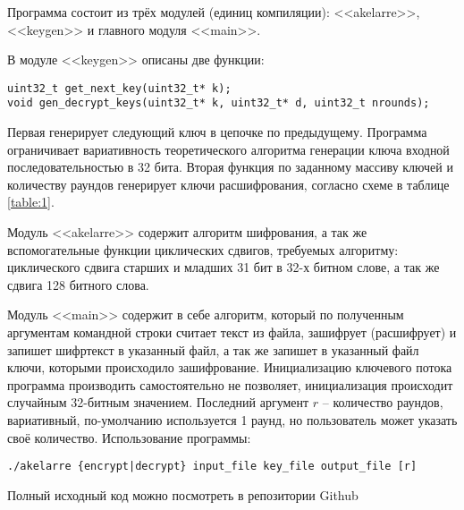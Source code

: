 \documentclass[12pt, a4paper]{article}
\begin{document}
Программа состоит из трёх модулей (единиц компиляции): <<akelarre>>, <<keygen>> и главного модуля <<main>>.

В модуле <<keygen>> описаны две функции: 

\begin{lstlisting}
uint32_t get_next_key(uint32_t* k);
void gen_decrypt_keys(uint32_t* k, uint32_t* d, uint32_t nrounds);
\end{lstlisting}

Первая генерирует следующий ключ в цепочке по предыдущему. Программа ограничивает вариативность теоретического алгоритма генерации ключа входной последовательностью в 32 бита. Вторая функция по заданному массиву ключей и количеству раундов генерирует ключи расшифрования, согласно схеме в таблице \ref{table:1}.

Модуль <<akelarre>> содержит алгоритм шифрования, а так же вспомогательные функции циклических сдвигов, требуемых алгоритму: циклического сдвига старших и младших 31 бит в 32-х битном слове, а так же сдвига 128 битного слова.

Модуль <<main>> содержит в себе алгоритм, который по полученным аргументам командной строки считает текст из файла, зашифрует (расшифрует) и запишет шифртекст в указанный файл, а так же запишет в указанный файл ключи, которыми происходило зашифрование. Инициализацию ключевого потока программа производить самостоятельно не позволяет, инициализация происходит случайным 32-битным значением. Последний аргумент $r$ -- количество раундов, вариативный, по-умолчанию используется 1 раунд, но пользователь может указать своё количество. Использование программы: 

\begin{lstlisting}
./akelarre {encrypt|decrypt} input_file key_file output_file [r]
\end{lstlisting}

Полный исходный код можно посмотреть в репозитории Github \autocite{github}

\newpage


\nocite{*}
\printbibliography[%
   heading=bibintoc%
    ,title={Список использованных источников} %
]
\end{document}
